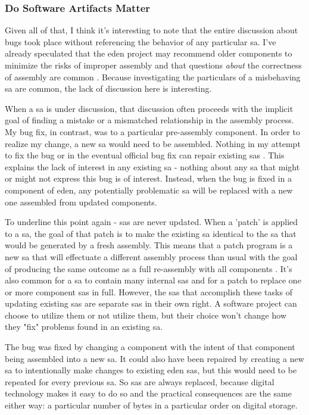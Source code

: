 \documentclass[a4paper,man,natbib,floatsintext]{apa6}
\begin{document}
   \subsubsection{Do Software Artifacts Matter}
   Given all of that, I think it's interesting to note that the entire discussion about bugs took place without referencing the behavior of any particular \gls{sa}. I've already speculated that the \acrshort{eden} project may recommend older components to minimize the risks of improper assembly and that questions \textit{about} the correctness of assembly are common \citep{Trendspotter2020-ps}. Because investigating the particulars of a misbehaving \gls{sa} are common, the lack of discussion here is interesting. 

   When a \gls{sa} is under discussion, that discussion often proceeds with the implicit goal of finding a mistake or a mismatched relationship in the assembly process. My bug fix, in contrast, was to a particular pre-assembly component. In order to realize my change, a new \gls{sa} would need to be assembled. Nothing in my attempt to fix the bug or in the eventual official bug fix can repair existing \glspl{sa} \citep{Konig2020-yx,Konig2020-ey}. This explains the lack of interest in any existing \gls{sa} - nothing about any \gls{sa} that might or might not express this bug is of interest. Instead, when the bug is fixed in a component of \acrshort{eden}, any potentially problematic \gls{sa} will be replaced with a new one assembled from updated components.

   To underline this point again - \glspl{sa} are never updated. When a 'patch' is applied to a \gls{sa}, the goal of that patch is to make the existing \gls{sa} identical to the \gls{sa} that would be generated by a fresh assembly. This means that a patch program is a new \gls{sa} that will effectuate a different assembly process than usual with the goal of producing the same outcome as a full re-assembly with all components \citep{Endsley_undated-iy}. It's also common for a \gls{sa} to contain many internal \glspl{sa} and for a patch to replace one or more component \glspl{sa} in full. However, the \glspl{sa} that accomplish these tasks of updating existing \glspl{sa} are separate \glspl{sa} in their own right. A software project can choose to utilize them or not utilize them, but their choice won't change how they "fix" problems found in an existing \gls{sa}. 

   The bug was fixed by changing a component with the intent of that component being assembled into a new \gls{sa}. It could also have been repaired by creating a new \gls{sa} to intentionally make changes to existing \acrshort{eden} \glspl{sa}, but this would need to be repeated for every previous \gls{sa}. So \glspl{sa} are always replaced, because digital technology makes it easy to do so and the practical consequences are the same either way: a particular number of bytes in a particular order on digital storage. 
\end{document}

